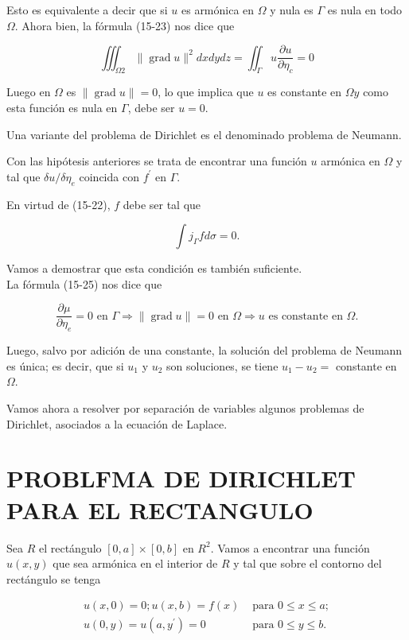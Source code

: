 \documentclass[10pt]{article}
\theoremstyle{plain}
\theoremstyle{definition}
\theoremstyle{remark}
\begin{document}
Esto es equivalente a decir que si $u$ es armónica en $\Omega$ y nula es $\Gamma$ es nula en todo $\Omega$. Ahora bien, la fórmula (15-23) nos dice que


\begin{equation*}
\iiint_{\Omega 2}\|\operatorname{grad} u\|^{2} d x d y d z=\iint_{\Gamma} u \frac{\partial u}{\partial \eta_{c}}=0 \tag{15-25}
\end{equation*}


Luego en $\Omega$ es $\|\operatorname{grad} u\|=0$, lo que implica que $u$ es constante en $\Omega y$ como esta función es nula en $\Gamma$, debe ser $u=0$.

Una variante del problema de Dirichlet es el denominado problema de Neumann.

Con las hipótesis anteriores se trata de encontrar una función $u$ armónica en $\Omega$ y tal que $\delta u / \delta \eta_{e}$ coincida con $f^{\prime}$ en $\Gamma$.


En virtud de (15-22), $f$ debe ser tal que

$$
\int j_{\Gamma} f d \sigma=0 .
$$

Vamos a demostrar que esta condición es también suficiente.\\
La fórmula (15-25) nos dice que

$$
\frac{\partial \mu}{\partial \eta_{e}}=0 \text { en } \Gamma \Rightarrow\|\operatorname{grad} u\|=0 \text { en } \Omega \Rightarrow u \text { es constante en } \Omega .
$$

Luego, salvo por adición de una constante, la solución del problema de Neumann es única; es decir, que si $u_{1}$ y $u_{2}$ son soluciones, se tiene $u_{1}-u_{2}=$ constante en $\Omega$.

Vamos ahora a resolver por separación de variables algunos problemas de Dirichlet, asociados a la ecuación de Laplace.

\section*{PROBLFMA DE DIRICHLET PARA EL RECTANGULO}
Sea $R$ el rectángulo $[0, a] \times[0, b]$ en $R^{2}$. Vamos a encontrar una función $u(x, y)$ que sea armónica en el interior de $R$ y tal que sobre el contorno del rectángulo se tenga

\[
\begin{array}{ll}
u(x, 0)=0 ; u(x, b)=f(x) & \text { para } 0 \leqslant x \leqslant a ; \\
u(0, y)=u\left(a, y^{\prime}\right)=0 & \text { para } 0 \leqslant y \leqslant b . \tag{15-26}
\end{array}
\]
\end{document}

